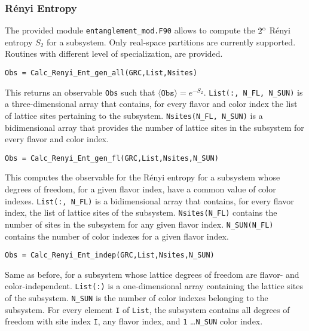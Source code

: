 %
\subsubsection{R{\'e}nyi Entropy}
The provided module \texttt{entanglement\_mod.F90} allows to compute the $2^{\rm o}$ R\'enyi entropy $S_2$ for a subsystem. Only real-space partitions are currently supported. Routines with different level of specialization, are provided.

\begin{lstlisting}[style=fortran]
Obs = Calc_Renyi_Ent_gen_all(GRC,List,Nsites)
\end{lstlisting}

This returns an observable \texttt{Obs} such that $\langle\texttt{Obs}\rangle=e^{-S_2}$. \texttt{List(:, N\_FL, N\_SUN)} is a three-dimensional array that contains, for every flavor and color index the list of lattice sites pertaining to the subsystem. \texttt{Nsites(N\_FL, N\_SUN)} is a bidimensional array that provides the number of lattice sites in the subsystem for every flavor and color index.

\begin{lstlisting}[style=fortran]
Obs = Calc_Renyi_Ent_gen_fl(GRC,List,Nsites,N_SUN)
\end{lstlisting}
This computes the observable for the R\'enyi entropy for a subsystem whose degrees of freedom, for a given flavor index, have a common value of color indexes. \texttt{List(:, N\_FL)} is a bidimensional array that contains, for every flavor index, the list of lattice sites of the subsystem. \texttt{Nsites(N\_FL)} contains the number of sites in the subsystem for any given flavor index. \texttt{N\_SUN(N\_FL)} contains the number of color indexes for a given flavor index.

\begin{lstlisting}[style=fortran]
Obs = Calc_Renyi_Ent_indep(GRC,List,Nsites,N_SUN)
\end{lstlisting}
Same as before, for a subsystem whose lattice degrees of freedom are flavor- and color-independent. \texttt{List(:)} is a one-dimensional array containing the lattice sites of the subsystem.
\texttt{N\_SUN} is the number of color indexes belonging to the subsystem.
For every element \texttt{I} of \texttt{List}, the subsystem contains all degrees of freedom with site index \texttt{I}, any flavor index, and \texttt{1} \ldots \texttt{N\_SUN} color index.

